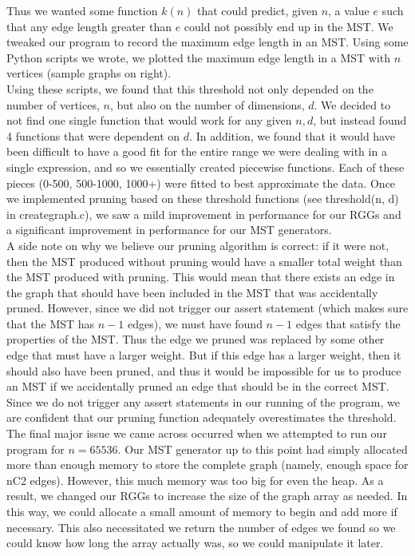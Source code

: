 \documentclass[12pt]{article}
\begin{document}
Thus we wanted some function $k(n)$ that could predict, given $n$, a value $e$ such that any edge length greater than $e$ could not possibly end up in the MST. We tweaked our program to record the maximum edge length in an MST. Using some Python scripts we wrote, we plotted the maximum edge length in a MST with $n$ vertices (sample graphs on right). \\

Using these scripts, we found that this threshold not only depended on the number of vertices, $n$, but also on the number of dimensions, $d$. We decided to not find one single function that would work for any given $n, d$, but instead found 4 functions that were dependent on $d$. In addition, we found that it would have been difficult to have a good fit for the entire range we were dealing with in a single expression, and so we essentially created piecewise functions. Each of these pieces (0-500, 500-1000, 1000+) were fitted to best approximate the data. Once we implemented pruning based on these threshold functions (see threshold(n, d) in creategraph.c), we saw a mild improvement in performance for our RGGs and a significant improvement in performance for our MST generators. \\

A side note on why we believe our pruning algorithm is correct: if it were not, then the MST produced without pruning would have a smaller total weight than the MST produced with pruning. This would mean that there exists an edge in the graph that should have been included in the MST that was accidentally pruned. However, since we did not trigger our assert statement (which makes sure that the MST has $n - 1$ edges), we must have found $n - 1$ edges that satisfy the properties of the MST. Thus the edge we pruned was replaced by some other edge that must have a larger weight. But if this edge has a larger weight, then it should also have been pruned, and thus it would be impossible for us to produce an MST if we accidentally pruned an edge that should be in the correct MST. Since we do not trigger any assert statements in our running of the program, we are confident that our pruning function adequately overestimates the threshold. \\

The final major issue we came across occurred when we attempted to run our program for $n = 65536$. Our MST generator up to this point had simply allocated more than enough memory to store the complete graph (namely, enough space for nC2 edges). However, this much memory was too big for even the heap. As a result, we changed our RGGs to increase the size of the graph array as needed. In this way, we could allocate a small amount of memory to begin and add more if necessary. This also necessitated we return the number of edges we found so we could know how long the array actually was, so we could manipulate it later. \\
\end{document}
